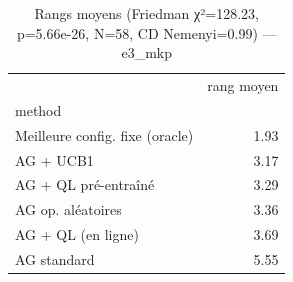 \begin{table}
\caption{Rangs moyens (Friedman χ²=128.23, p=5.66e-26, N=58, CD Nemenyi=0.99) — e3_mkp}
\label{tab:friedman_rangs}
\begin{tabular}{lr}
\toprule
 & rang moyen \\
method &  \\
\midrule
Meilleure config. fixe (oracle) & 1.93 \\
AG + UCB1 & 3.17 \\
AG + QL pré-entraîné & 3.29 \\
AG op. aléatoires & 3.36 \\
AG + QL (en ligne) & 3.69 \\
AG standard & 5.55 \\
\bottomrule
\end{tabular}
\end{table}
